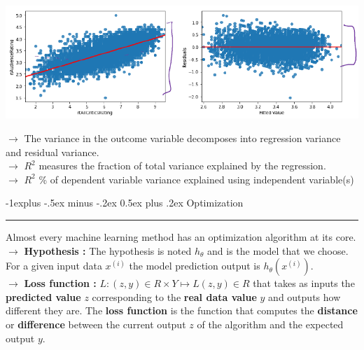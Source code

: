 \documentclass[letterpaper, 10.5pt,landscape]{article}
\makeatletter
\renewcommand{\subsection}{\@startsection{subsection}{2}{0mm}%
                                {-1explus -.5ex minus -.2ex}%
                                {0.5ex plus .2ex}%
                                {\normalfont\normalsize\bfseries}}
\makeatother
\begin{document}
\begin{multicols*}{3}
\begin{minipage}{\linewidth}
    \centering
    \includegraphics[width=\textwidth]{figures/Residual_variance.PNG}
\end{minipage}

$\rightarrow$ The variance in the outcome variable decomposes into regression variance and residual variance.  \\
$\rightarrow$ $R^{2}$ measures the fraction of total variance explained by the regression. \\
$\rightarrow$ $R^{2}$  \% of dependent variable variance explained using independent variable(s)


\vspace*{\fill}






\subsection{Optimization} {\color{teal}\hrule height 0.5pt} \smallskip

Almost every machine learning method has an optimization algorithm at its core. \\
$\rightarrow$ \textbf{Hypothesis : } The hypothesis is noted $h_{\theta}$ and is the model that we choose. For a given input data $x^{(i)}$ the model prediction output is $\boxed{h_{\theta}(x^{(i)})}$. \\
$\rightarrow$ \textbf{Loss function : } 
\(\boxed{L:(z,y)  \in  R \times Y \longmapsto  L(z,y) \in R} \) that takes as inputs the \textbf{predicted value} $z$ corresponding to the \textbf{real data value} $y$ and outputs how different they are. The \textbf{loss function} is the function that computes the \textbf{distance} or \textbf{difference} between the current output $z$ of the algorithm and the expected output $y$. 


\end{multicols*}
\end{document}
